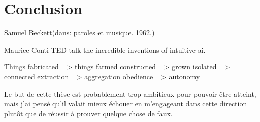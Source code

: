 %
\chapter{Conclusion}
\label{ch:conclusion}

{Samuel Beckett}{(dans: paroles et musique. 1962.)}

Maurice Conti
TED talk the incredible inventions of intuitive ai.

Things fabricated => things farmed
constructed => grown
isolated => connected
extraction => aggregation
obedience => autonomy


 Le but de cette thèse est probablement trop ambitieux pour pouvoir être atteint, mais j’ai pensé qu’il valait mieux échouer en m’engageant dans cette direction plutôt que de réussir à prouver quelque chose de faux.